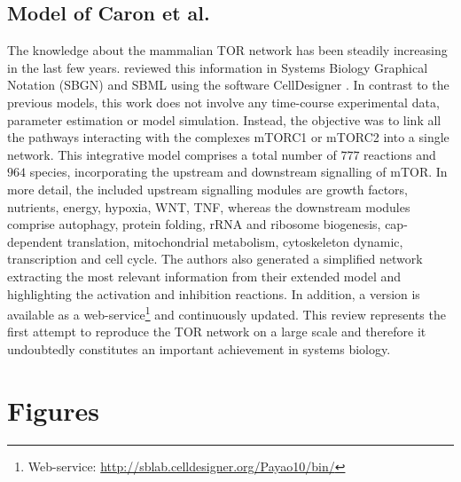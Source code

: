\subsection{Model of Caron et al.}
\label{subsec:Model of Caron et al.}
The knowledge about the mammalian TOR network has been steadily increasing in the last few years. \citet{Caron2010} reviewed this information in Systems Biology Graphical Notation (SBGN) \citep{lenovere2009systems} and SBML \citep{hucka2003systems} using the software CellDesigner \citep{Funahashi2003, Funahashi2008}. In contrast to the previous models, this work does not involve any time-course experimental data, parameter estimation or model simulation. Instead, the objective was to link all the pathways interacting with the complexes mTORC1 or mTORC2 into a single network. This integrative model comprises a total number of $777$ reactions and $964$ species, incorporating the upstream and downstream signalling of mTOR. In more detail, the included upstream signalling modules are growth factors, nutrients, energy, hypoxia, WNT, TNF, whereas the downstream modules comprise autophagy, protein folding, rRNA and ribosome biogenesis, cap-dependent translation, mitochondrial metabolism, cytoskeleton dynamic, transcription and cell cycle. The authors also generated a simplified network extracting the most relevant information from their extended model and highlighting the activation and inhibition reactions. In addition, a version is available as a web-service\footnote{Web-service: \href{http://sblab.celldesigner.org/Payao10/bin/}{http://sblab.celldesigner.org/Payao10/bin/}} and continuously updated. This review represents the first attempt to reproduce the TOR network on a large scale and therefore it undoubtedly constitutes an important achievement in systems biology.


\section{Figures}
\label{chap4:Figures}

\clearpage

